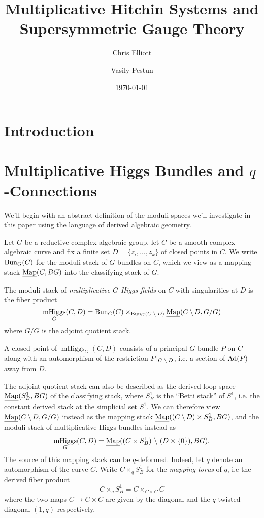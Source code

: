 \documentclass[10pt, oneside]{article}
\title{Multiplicative Hitchin Systems and Supersymmetric Gauge Theory}
\author{Chris Elliott \and Vasily Pestun}
\date{\today}
\DeclareMathOperator{\mhiggs}{mHiggs}
\newcommand{\map}{\ul{\mr{Map}}}
\begin{document}
\maketitle 
\begin{abstract}
 
\end{abstract}

\section{Introduction}

\section{Multiplicative Higgs Bundles and $q$-Connections}
We'll begin with an abstract definition of the moduli spaces we'll investigate in this paper using the language of derived algebraic geometry.

Let $G$ be a reductive complex algebraic group, let $C$ be a smooth complex algebraic curve and fix a finite set $D = \{z_i, \ldots, z_k\}$ of closed points in $C$.  We write $\operatorname{Bun}_G(C)$ for the moduli stack of $G$-bundles on $C$, which we view as a mapping stack $\map(C, BG)$ into the classifying stack of $G$.

\begin{definition}
The moduli stack of \emph{multiplicative $G$-Higgs fields} on $C$ with singularities at $D$ is the fiber product
\[\mhiggs_G(C,D) = \bun_G(C) \times_{\bun_G(C \! \bs \! D)} \map(C \! \bs \! D, G/G)\]
where $G/G$ is the adjoint quotient stack.
\end{definition}

\begin{remark}
A closed point of $\mhiggs_G(C,D)$ consists of a principal $G$-bundle $P$ on $C$ along with an automorphism of the restriction $P|_{C \! \ \backslash \  \! D}$, i.e. a section of $\mathrm{Ad}(P)$ away from $D$.
\end{remark}

The adjoint quotient stack can also be described as the derived loop space $\map(S^1_B, BG)$ of the classifying stack, where $S^1_B$ is the ``Betti stack'' of $S^1$, i.e. the constant derived stack at the simplicial set $S^1$.  We can therefore view $\map(C \! \bs \! D, G/G)$ instead as the mapping stack $\map((C \! \bs \! D) \times S^1_B, BG)$, and the moduli stack of multiplicative Higgs bundles instead as
\[\mhiggs_G(C,D) = \map((C \times S^1_B) \bs (D \times \{0\}), BG).\]  
The source of this mapping stack can be $q$-deformed.  Indeed, let $q$ denote an automorphism of the curve $C$.  Write $C \times_q S^1_B$ for the \emph{mapping torus} of $q$, i.e the derived fiber product
\[C \times_q S^1_B = C \times_{C \times C} C\]
where the two maps $C \to C \times C$ are given by the diagonal and the $q$-twisted diagonal $(1,q)$ respectively.
\end{document}
